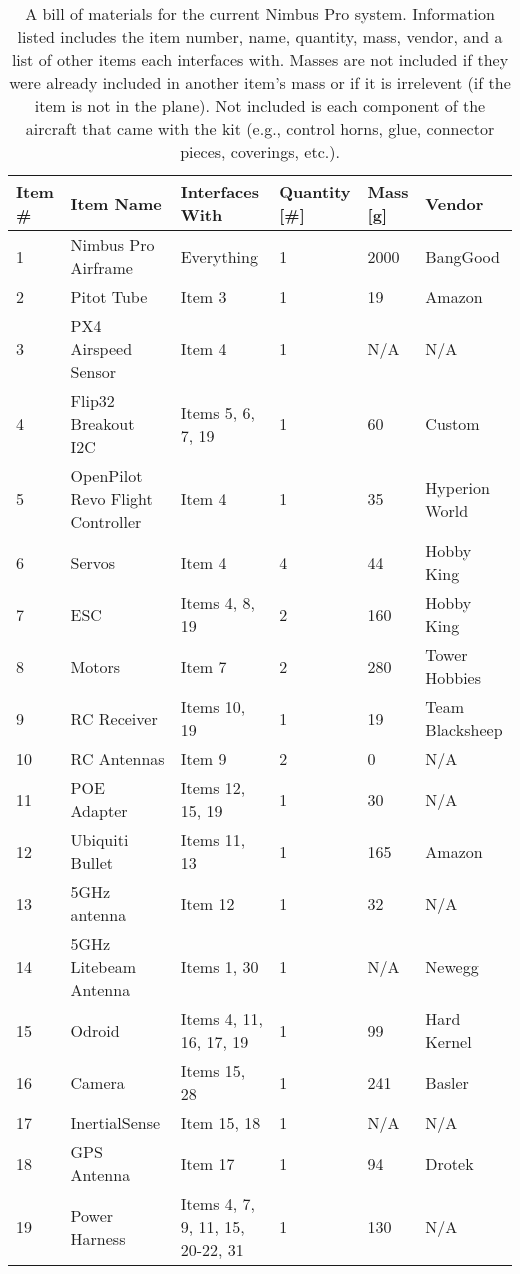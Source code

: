 \documentclass[]{auvsi_doc}
\begin{document}
	\begin{table}[h!]
		\begin{center}
			\caption{A bill of materials for the current Nimbus Pro system. Information listed includes the item number, name, quantity, mass, vendor, and a list of other items each interfaces with. Masses are not included if they were already included in another item's mass or if it is irrelevent (if the item is not in the plane). Not included is each component of the aircraft that came with the kit (e.g., control horns, glue, connector pieces, coverings, etc.).}
			\label{table:BOM}
			\begin{tabular}{p{1cm}p{4cm}p{3cm}p{1.5cm}p{1cm}p{2.5cm}}
				\toprule
				Item \# & Item Name & Interfaces With & Quantity [\#] & Mass [g] & Vendor \\
				\midrule
				1 & Nimbus Pro Airframe & Everything & 1 & 2000 & BangGood   \\
				2 & Pitot Tube & Item 3 & 1 & 19 & Amazon \\
				3 & PX4 Airspeed Sensor & Item 4 & 1 & N/A & N/A \\
				4 & Flip32 Breakout I2C & Items 5, 6, 7, 19 & 1 & 60 & Custom \\
				5 & OpenPilot Revo \newline Flight Controller & Item 4 & 1 & 35 & Hyperion \newline World  \\
				6 & Servos & Item 4 & 4 & 44 & Hobby King \\
				7 & ESC & Items 4, 8, 19 & 2 & 160 & Hobby King \\
				8 & Motors & Item 7 & 2 & 280 & Tower \newline Hobbies \\ 
				9 & RC Receiver & Items 10, 19 & 1 & 19 & Team \newline Blacksheep \\
				10 & RC Antennas & Item 9 & 2 & 0 & N/A \\
				11 & POE Adapter & Items 12, 15, 19 & 1 & 30 & N/A \\
				12 & Ubiquiti Bullet & Items 11, 13 & 1 & 165 & Amazon \\
				13 & 5GHz antenna & Item 12 & 1 & 32 & N/A \\
				14 & 5GHz Litebeam \newline Antenna & Items 1, 30 & 1 & N/A & Newegg\\
				15 & Odroid & Items 4, 11, 16, 17, 19 & 1 & 99 & Hard Kernel \\
				16 & Camera & Items 15, 28 & 1 & 241 & Basler \\
				17 & InertialSense & Item 15, 18 & 1 & N/A & N/A \\
				18 & GPS Antenna & Item 17 & 1 & 94 & Drotek \\
				19 & Power Harness & Items 4, 7, 9, 11, 15, 20-22, 31 & 1 & 130 & N/A \\
				\bottomrule
			\end{tabular}
		\end{center}
	\end{table}
	
\end{document}
